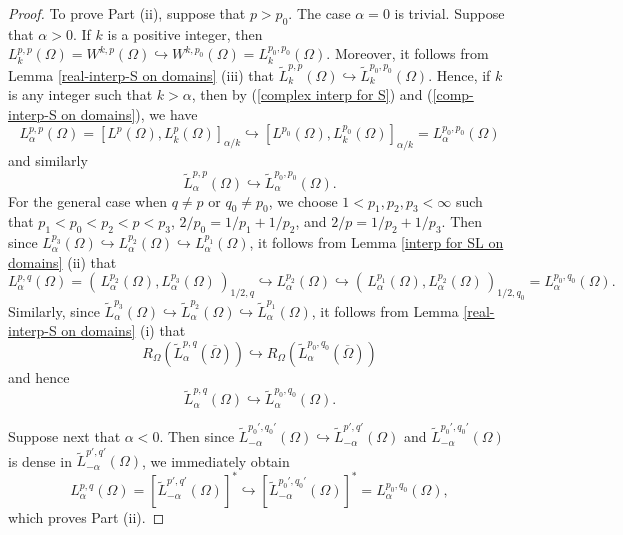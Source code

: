 \documentclass[reqno,centertags,11pt]{amsart}
\theoremstyle{definition}
\numberwithin{thm}{section}
\numberwithin{equation}{section}
\begin{document}
\begin{proof}
To prove Part (ii), suppose that $p>p_0$.  The case $\alpha =0$ is trivial. Suppose that $\alpha >0$. If $k$ is a positive  integer, then $L_k^{p,p}(\Omega ) =W^{k,p}(\Omega )  \hookrightarrow  W^{k,p_0}(\Omega )= L_k^{p_0 ,p_0}(\Omega )$.
Moreover, it follows from Lemma \ref{real-interp-S on domains} (iii) that $\widetilde{L}_k^{p,p}(\Omega ) \hookrightarrow \widetilde{L}_k^{p_0 ,p_0}(\Omega )$.
Hence, if $k $ is any integer such that   $k >  \alpha $, then by   (\ref{complex interp for S}) and (\ref{comp-interp-S on domains}), we   have
$$
 L_\alpha^{p,p} (\Omega )  = \left[ L^p (\Omega ), L_k^{p}(\Omega )\right]_{\alpha /k} \hookrightarrow \left[ L^{p_0} (\Omega ), L_k^{p_0}(\Omega )\right]_{\alpha /k}=L_\alpha^{p_0 , p_0} (\Omega )
$$
and similarly
$$
\widetilde{L}_\alpha^{p,p}(\Omega ) \hookrightarrow \widetilde{L}_\alpha^{p_0 ,p_0}(\Omega ).
$$
For the general case when $q \neq p$ or $q_0 \neq p_0$, we choose $1<p_1 , p_2 , p_3 <\infty$ such that  $p_1 < p_0 < p_2 < p <p_3$, $2/p_0 =1/p_1 +1/p_2$, and $2/p =1/p_2 +1/p_3$.
Then since $L_\alpha^{p_3}(\Omega )  \hookrightarrow  L_\alpha^{p_2}(\Omega )\hookrightarrow  L_\alpha^{p_1}(\Omega )$, it follows from  Lemma \ref{interp for SL on domains} (ii) that
\[
L_\alpha^{p,q}(\Omega ) = \left(\,  L_\alpha^{p_2}(\Omega ) , L_\alpha^{p_3}(\Omega ) \, \right)_{1/2,q}  \hookrightarrow  L_\alpha^{p_2}(\Omega ) \hookrightarrow   \left(\,  L_\alpha^{p_1}(\Omega ) , L_\alpha^{p_2}(\Omega ) \, \right)_{1/2,q_0} = L_\alpha^{p_0 ,q_0 }(\Omega ).
\]
Similarly, since $\widetilde{L}_\alpha^{p_3}(\Omega )  \hookrightarrow  \widetilde{L}_\alpha^{p_2}(\Omega )\hookrightarrow  \widetilde{L}_\alpha^{p_1}(\Omega )$, it follows from  Lemma \ref{real-interp-S on domains} (i) that
\[
R_\Omega  (\widetilde{L}_\alpha^{p,q} (\overline{\Omega} ) ) \hookrightarrow  R_\Omega  (\widetilde{L}_\alpha^{p_0 ,q_0} (\overline{\Omega} ) )
\]
and hence
\[
\widetilde{L}_\alpha^{p,q}(\Omega )   \hookrightarrow \widetilde{L}_\alpha^{p_0 ,q_0 }(\Omega ).
\]

Suppose next that  $\alpha < 0$. Then since $\widetilde{L}_{-\alpha}^{p_0 ',q_0 '}(\Omega )   \hookrightarrow \widetilde{L}_{-\alpha}^{p' ,q ' }(\Omega )$ and $\widetilde{L}_{-\alpha}^{p_0 ',q_0 '}(\Omega ) $ is dense in $ \widetilde{L}_{-\alpha}^{p' ,q ' }(\Omega )$, we immediately obtain
\[
L_\alpha^{p,q}(\Omega )  = \left[ \widetilde{L}_{-\alpha}^{p',q'}(\Omega ) \right]^* \hookrightarrow \left[ \widetilde{L}_{-\alpha}^{p_0 ',q_0 '}(\Omega ) \right]^* = L_{\alpha}^{p_0 ,q_0 }(\Omega )  ,
\]
which proves Part (ii).


\end{proof}
\end{document}
